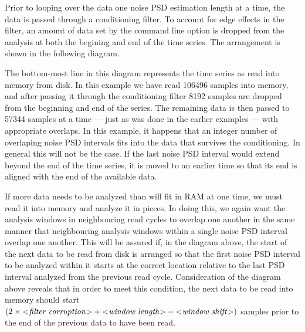 Prior to looping over the data one noise PSD estimation length at a time,
the data is passed through a conditioning filter.  To account for edge
effects in the filter, an amount of data set by the command line option
 is dropped from the analysis at both the
begining and end of the time series.  The arrangement is shown in the
following diagram.
\begin{center}

\end{center}
The bottom-most line in this diagram represents the time series as read
into memory from disk.  In this example we have read 106496 samples into
memory, and after passing it through the conditioning filter 8192 samples
are dropped from the beginning and end of the series.  The remaining data
is then passed to  57344 samples at a time --- just as
was done in the earlier examples --- with appropriate overlaps.  In this
example, it happens that an integer number of overlaping noise PSD
intervals fits into the data that survives the conditioning.  In general
this will not be the case.  If the last noise PSD interval would extend
beyond the end of the time series, it is moved to an earlier time so that
its end is aligned with the end of the available data.

If more data needs to be analyzed than will fit in RAM at one time, we must
read it into memory and analyze it in pieces.  In doing this, we again want
the analysis windows in neighbouring read cycles to overlap one another in
the same manner that neighbouring analysis windows within a single noise
PSD interval overlap one another.  This will be assured if, in the diagram
above, the start of the next data to be read from disk is arranged so that
the first noise PSD interval to be analyzed within it starts at the correct
location relative to the last PSD interval analyzed from the previous read
cycle.  Consideration of the diagram above reveals that in order to meet
this condition, the next data to be read into memory should start $(2
\times \mbox{$<$\textit{filter corruption}$>$} + \mbox{$<$\textit{window length}$>$} -
\mbox{$<$\textit{window shift}$>$})$ samples prior to the end of the previous data
to have been read.

